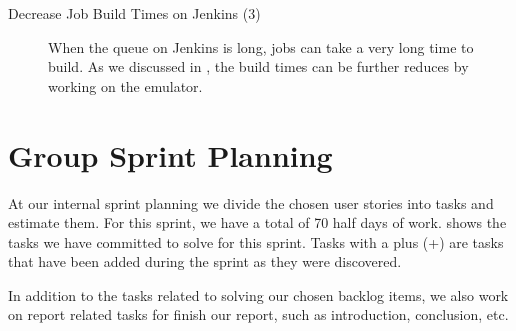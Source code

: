 \begin{description}
  \item[Decrease Job Build Times on Jenkins (3)] When the queue on Jenkins is long, jobs can take a very long time to build. As we discussed in , the build times can be further reduces by working on the emulator.
\end{description}

\section{Group Sprint Planning}\label{sec:S4_group}
At our internal sprint planning we divide the chosen user stories into tasks and estimate them. For this sprint, we have a total of 70 half days of work.  shows the tasks we have committed to solve for this sprint. Tasks with a plus (+) are tasks that have been added during the sprint as they were discovered.

In addition to the tasks related to solving our chosen backlog items, we also work on report related tasks for finish our report, such as introduction, conclusion, etc.

